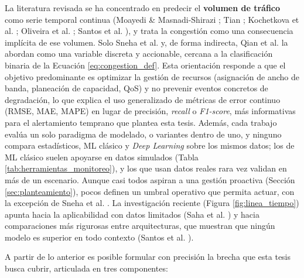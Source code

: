 \documentclass[12pt]{report}
\begin{document}
La literatura revisada se ha concentrado en predecir el \textbf{volumen de tráfico} como serie temporal continua (Moayedi \& Masnadi-Shirazi \cite{moayedi2008}; Tian \cite{tian2021}; Kochetkova et al. \cite{kochetkova2023}; Oliveira et al. \cite{oliveira2016}; Santos et al. \cite{santos2022}), y trata la congestión como una consecuencia implícita de ese volumen. Solo Sneha et al. \cite{sneha2020} y, de forma indirecta, Qian et al. \cite{qian2016} la abordan como una variable discreta y accionable, cercana a la clasificación binaria de la Ecuación \ref{eq:congestion_def}. Esta orientación responde a que el objetivo predominante es optimizar la gestión de recursos (asignación de ancho de banda, planeación de capacidad, QoS) y no prevenir eventos concretos de degradación, lo que explica el uso generalizado de métricas de error continuo (RMSE, MAE, MAPE) en lugar de precisión, \textit{recall} o \textit{F1-score}, más informativas para el alertamiento temprano que plantea esta tesis. Además, cada trabajo evalúa un solo paradigma de modelado, o variantes dentro de uno, y ninguno compara estadísticos, ML clásico y \textit{Deep Learning} sobre los mismos datos; los de ML clásico suelen apoyarse en datos simulados (Tabla \ref{tab:herramientas_monitoreo}), y los que usan datos reales rara vez validan en más de un escenario. Aunque casi todos aspiran a una gestión proactiva (Sección \ref{sec:planteamiento}), pocos definen un umbral operativo que permita actuar, con la excepción de Sneha et al. \cite{sneha2020}. La investigación reciente (Figura \ref{fig:linea_tiempo}) apunta hacia la aplicabilidad con datos limitados (Saha et al. \cite{saha2024}) y hacia comparaciones más rigurosas entre arquitecturas, que muestran que ningún modelo es superior en todo contexto (Santos et al. \cite{santos2022}).

A partir de lo anterior es posible formular con precisión la brecha que esta tesis busca cubrir, articulada en tres componentes:
\end{document}
